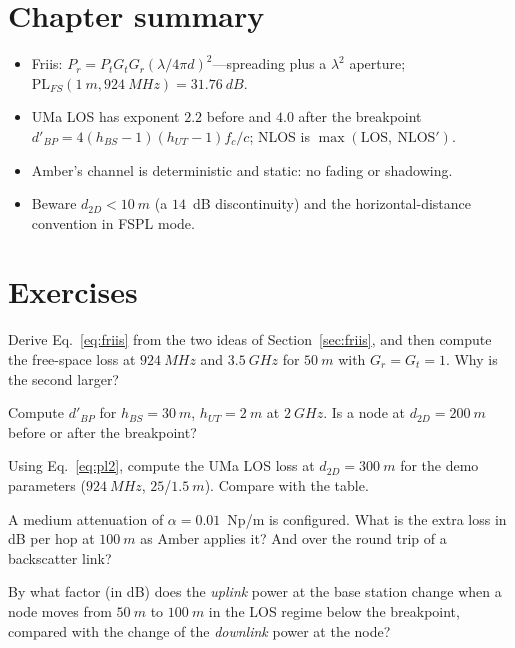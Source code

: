 \section{Chapter summary}
\begin{itemize}
 \item Friis: $P_r=P_tG_tG_r(\lambda/4\pi d)^2$---spreading plus a $\lambda^2$ aperture; $\mathrm{PL}_{FS}(\SI{1}{m},\SI{924}{MHz})=\SI{31.76}{dB}$.
 \item UMa LOS has exponent $2.2$ before and $4.0$ after the breakpoint $d'_{BP}=4(h_{BS}-1)(h_{UT}-1)f_c/c$; NLOS is $\max(\text{LOS},\ \text{NLOS}')$.
 \item Amber's channel is deterministic and static: no fading or shadowing.
 \item Beware $d_{2D}<\SI{10}{m}$ (a $14$~dB discontinuity) and the horizontal-distance convention in FSPL mode.
\end{itemize}

\section*{Exercises}
\begin{exercise}
Derive Eq.~\eqref{eq:friis} from the two ideas of Section~\ref{sec:friis}, and then compute the free-space loss at $\SI{924}{MHz}$ and $\SI{3.5}{GHz}$ for $\SI{50}{m}$ with $G_r=G_t=1$. Why is the second larger?
\end{exercise}
\begin{exercise}
Compute $d'_{BP}$ for $h_{BS}=\SI{30}{m}$, $h_{UT}=\SI{2}{m}$ at $\SI{2}{GHz}$. Is a node at $d_{2D}=\SI{200}{m}$ before or after the breakpoint?
\end{exercise}
\begin{exercise}
Using Eq.~\eqref{eq:pl2}, compute the UMa LOS loss at $d_{2D}=\SI{300}{m}$ for the demo parameters ($\SI{924}{MHz}$, $25$/$\SI{1.5}{m}$). Compare with the table.
\end{exercise}
\begin{exercise}
A medium attenuation of $\alpha=0.01$~Np/m is configured. What is the extra loss in dB per hop at $\SI{100}{m}$ as Amber applies it? And over the round trip of a backscatter link?
\end{exercise}
\begin{exercise}
By what factor (in dB) does the \emph{uplink} power at the base station change when a node moves from $\SI{50}{m}$ to $\SI{100}{m}$ in the LOS regime below the breakpoint, compared with the change of the \emph{downlink} power at the node?
\end{exercise}
